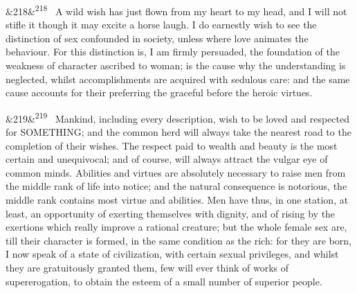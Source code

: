 \documentclass[12pt]{article}
\newcommand{\para}[1][]{\par\noindent\ifx&#1&\else\textsuperscript{\footnotesize #1}~\fi}
\begin{document}
\para[218] A wild wish has just flown from my heart to my head, and I will not stifle it though it may excite a horse laugh. I do earnestly wish to see the distinction of sex confounded in society, unless where love animates the behaviour. For this distinction is, I am firmly persuaded, the foundation of the weakness of character ascribed to woman; is the cause why the understanding is neglected, whilst accomplishments are acquired with sedulous care: and the same cause accounts for their preferring the graceful before the heroic virtues.

\para[219] Mankind, including every description, wish to be loved and respected for SOMETHING; and the common herd will always take the nearest road to the completion of their wishes. The respect paid to wealth and beauty is the most certain and unequivocal; and of course, will always attract the vulgar eye of common minds. Abilities and virtues are absolutely necessary to raise men from the middle rank of life into notice; and the natural consequence is notorious, the middle rank contains most virtue and abilities. Men have thus, in one station, at least, an opportunity of exerting themselves with dignity, and of rising by the exertions which really improve a rational creature; but the whole female sex are, till their character is formed, in the same condition as the rich: for they are born, I now speak of a state of civilization, with certain sexual privileges, and whilst they are gratuitously granted them, few will ever think of works of supererogation, to obtain the esteem of a small number of superior people.
\end{document}
